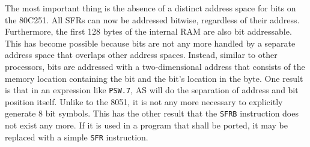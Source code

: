 \documentclass[12pt,twoside]{report}
\newcommand{\tty}[1]{{\tt #1}}
\newcommand{\asname}{{AS}}
\begin{document}
The most important thing is the absence of a distinct address space
for bits on the 80C251.  All SFRs can now be addressed bitwise,
regardless of their address.  Furthermore, the first 128 bytes of the
internal RAM are also bit addressable.  This has become possible
because bits are not any more handled by a separate address space
that overlaps other address spaces.  Instead, similar to other
processors, bits are addressed with a two-dimensional address that
consists of the memory location containing the bit and the bit's
location in the byte.  One result is that in an expression like
\tty{PSW.7}, \asname{} will do the separation of address and bit position itself.
Unlike to the 8051, it is not any more necessary to explicitly
generate 8 bit symbols.  This has the other result that the \tty{SFRB}
instruction does not exist any more.  If it is used in a program that
shall be ported, it may be replaced with a simple \tty{SFR} instruction.
\end{document}
